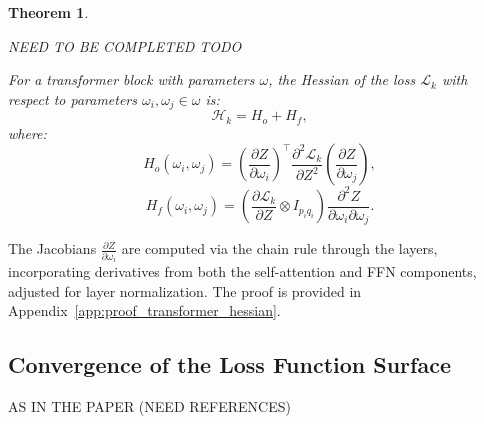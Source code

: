 \documentclass{article}
\newtheorem{theorem}{Theorem} %
\begin{document}
\begin{theorem}\label{thm:transformer_hessian}

NEED TO BE COMPLETED TODO

For a transformer block with parameters \( \omega \), the Hessian of the loss \( \mathcal{L}_k \) with respect to parameters \( \omega_i, \omega_j \in \omega \) is:
\[
\mathcal{H}_k = H_o + H_f,
\]
where:
\[
H_o(\omega_i, \omega_j) = \left( \frac{\partial Z}{\partial \omega_i} \right)^\top \frac{\partial^2 \mathcal{L}_k}{\partial Z^2} \left( \frac{\partial Z}{\partial \omega_j} \right),
\]
\[
H_f(\omega_i, \omega_j) = \left( \frac{\partial \mathcal{L}_k}{\partial Z} \otimes I_{p_i q_i} \right) \frac{\partial^2 Z}{\partial \omega_i \partial \omega_j}.
\]
\end{theorem}

The Jacobians \( \frac{\partial Z}{\partial \omega_i} \) are computed via the chain rule through the layers, incorporating derivatives from both the self-attention and FFN components, adjusted for layer normalization. The proof is provided in Appendix~\ref{app:proof_transformer_hessian}.

\subsection{Convergence of the Loss Function Surface}\label{subsec:loss_convergence}

AS IN THE PAPER (NEED REFERENCES)
\end{document}
